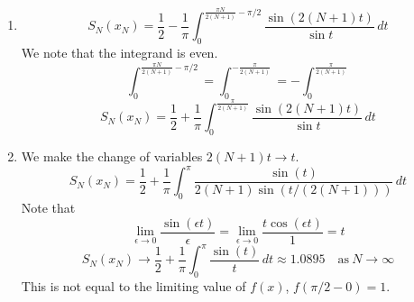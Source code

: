 {\begin{Solution}
\begin{enumerate}
\begin{gather*}
      \frac{ \sin(2 (N+1) x ) }{ \cos(x) } = 0 \\
      \boxed{
        x = x_n = \frac{ n \pi }{ 2(N+1) }, \quad
        n = 0, 1, \ldots, N, N+2, \ldots, 2N+2
        }
    \end{gather*}
    Note that $x_{N+1} = \pi / 2$ is not a solution as the denominator vanishes 
    there.  The function has a removable singularity at $x = \pi/2$ with 
    limiting value $(-1)^N$.
  \item
    \[
    S_N(x_N) = \frac{1}{2} - \frac{1}{\pi} 
    \int_0^{\frac{\pi N}{2(N+1)} -\pi/2} 
    \frac{ \sin(2 (N+1) t) }{ \sin t } \,d t 
    \]
    We note that the integrand is even.
    \[
    \int_0^{\frac{\pi N}{2(N+1)} -\pi/2} 
    = \int_0^{- \frac{\pi}{2(N+1)} } 
    = - \int_0^{ \frac{\pi}{2(N+1)} } 
    \]
    \[
    \boxed{
      S_N(x_N) = \frac{1}{2} + \frac{1}{\pi} 
      \int_0^{\frac{\pi}{2(N+1)} } 
      \frac{ \sin(2 (N+1) t) }{ \sin t } \,d t 
      }
    \]
  \item
    We make the change of variables $2(N+1) t \to t$.
    \[
    S_N(x_N) = \frac{1}{2} + \frac{1}{\pi} 
    \int_0^\pi
    \frac{ \sin(t) }{ 2(N+1) \sin(t/(2(N+1))) } \,d t 
    \]
    Note that 
    \[
    \lim_{\epsilon \to 0} \frac{ \sin( \epsilon t ) }{ \epsilon } 
    = \lim_{\epsilon \to 0} \frac{ t \cos( \epsilon t ) }{ 1 } 
    = t
    \]
    \[
    \boxed{
      S_N(x_N) \to \frac{1}{2} + \frac{1}{\pi} 
      \int_0^\pi \frac{ \sin(t) }{ t } \,d t \approx 1.0895
      \quad \mathrm{as}\ N \to \infty
      }
    \]
    This is not equal to the limiting value of $f(x)$, $f(\pi/2 - 0) = 1$.
  \end{enumerate}
\end{Solution}





}

